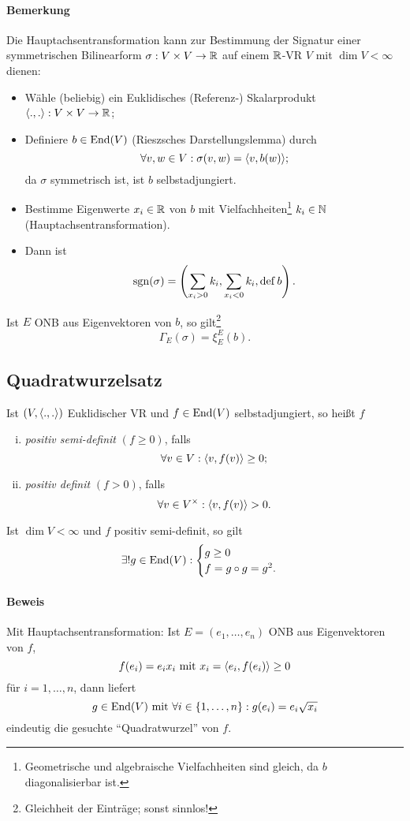 \paragraph{Bemerkung}
	Die Hauptachsentransformation kann zur Bestimmung der Signatur einer symmetrischen Bilinearform $ \sigma:V\times V\to \mathbb{R} $ auf einem $ \mathbb{R} $-VR $ V $ mit $ \dim V <\infty $ dienen:
		\begin{itemize}
			\item Wähle (beliebig) ein Euklidisches (Referenz-) Skalarprodukt $ \langle .,. \rangle:V\times V\to \mathbb{R} $;
			\item Definiere $ b\in \operatorname{End}(V) $ (Rieszsches Darstellungslemma) durch
				\[ \forall v,w\in V: \sigma(v,w) = \langle v,b(w) \rangle; \]
			da $ \sigma $ symmetrisch ist, ist $ b $ selbstadjungiert.
			\item Bestimme Eigenwerte $ x_i\in \mathbb{R} $ von $ b $ mit Vielfachheiten\footnote{Geometrische und algebraische Vielfachheiten sind gleich, da $ b $ diagonalisierbar ist.} $ k_i\in \mathbb{N} $ (Hauptachsentransformation).
			\item Dann ist
				\[ \operatorname{sgn}(\sigma) = \left(\sum_{x_i>0}k_i, \sum_{x_i<0}k_i,\operatorname{def} b\right). \]
		\end{itemize}
	Ist $ E $ ONB aus Eigenvektoren von $ b $, so gilt\footnote{Gleichheit der Einträge; sonst sinnlos!}
		\[ \Gamma_E(\sigma) = \xi_E^E(b). \]
\subsection{Quadratwurzelsatz}
\begin{Satz}[Quadratwurzelsatz]
	Ist $ (V,\langle .,. \rangle) $ Euklidischer VR und $ f\in \operatorname{End}(V) $ selbstadjungiert, so heißt $f$
		\begin{enumerate}[(i)]
			\item \emph{positiv semi-definit} $ (f\geq 0) $, falls
				\[ \forall v\in V :\langle v,f(v) \rangle\geq 0;\]
			\item \emph{positiv definit} $ (f>0) $, falls
				\[ \forall v\in V^\times: \langle v,f(v) \rangle>0. \]
		\end{enumerate}
	Ist $ \dim V < \infty $ und $ f $ positiv semi-definit, so gilt
		\[ \exists! g\in \operatorname{End}(V): \begin{cases}
		g\geq 0\\f = g\circ g =g^2.
		\end{cases} \]
\end{Satz}
\paragraph{Beweis}
	Mit Hauptachsentransformation: Ist $ E = (e_1,\dots,e_n) $ ONB aus Eigenvektoren von $ f $,
		\[ f(e_i) = e_ix_i \text{ mit } x_i = \langle e_i,f(e_i) \rangle\geq 0 \]
	für $ i=1,\dots,n $, dann liefert
		\[ g\in\operatorname{End}(V) \text{ mit } \forall i\in \{1,\dots,n\}: g(e_i) = e_i\sqrt{x_i} \]
	eindeutig die gesuchte "`Quadratwurzel"' von $ f $.
